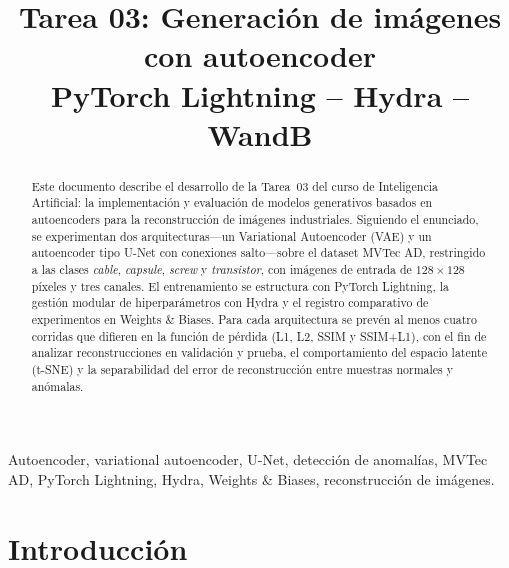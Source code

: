 \documentclass[conference]{IEEEtran}
\begin{document}
\title{Tarea 03: Generación de imágenes con autoencoder\\
PyTorch Lightning -- Hydra -- WandB}

\author{
\and
{}
\and
{}
}

\maketitle

\begin{abstract}
Este documento describe el desarrollo de la Tarea~03 del curso de Inteligencia Artificial: la implementación y evaluación de modelos generativos basados en autoencoders para la reconstrucción de imágenes industriales. Siguiendo el enunciado, se experimentan dos arquitecturas---un Variational Autoencoder (VAE) y un autoencoder tipo U-Net con conexiones salto---sobre el dataset MVTec AD, restringido a las clases \textit{cable}, \textit{capsule}, \textit{screw} y \textit{transistor}, con imágenes de entrada de $128 \times 128$ píxeles y tres canales. El entrenamiento se estructura con PyTorch Lightning, la gestión modular de hiperparámetros con Hydra y el registro comparativo de experimentos en Weights \& Biases. Para cada arquitectura se prevén al menos cuatro corridas que difieren en la función de pérdida (L1, L2, SSIM y SSIM+L1), con el fin de analizar reconstrucciones en validación y prueba, el comportamiento del espacio latente (t-SNE) y la separabilidad del error de reconstrucción entre muestras normales y anómalas.
\end{abstract}

\begin{IEEEkeywords}
Autoencoder, variational autoencoder, U-Net, detección de anomalías, MVTec AD, PyTorch Lightning, Hydra, Weights \& Biases, reconstrucción de imágenes.
\end{IEEEkeywords}

\section{Introducción}
\end{document}
